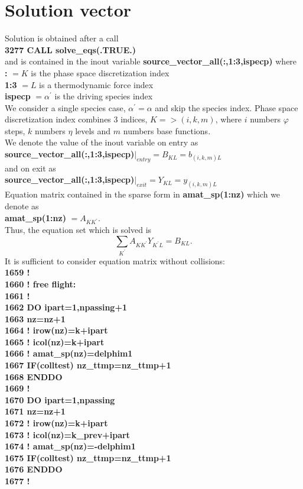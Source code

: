 \documentclass[preprint,prb,aps]{revtex4-1}
\newcommand{\be}[1]{\begin{equation} \label{#1}}
\newcommand{\ee}{\end{equation}}
\begin{document}
\section{Solution vector}
Solution is obtained after a call
\\
{\bf
3277     CALL solve\_eqs(.TRUE.)
}
\\
and is contained in the inout variable
{\bf
source\_vector\_all(:,1:3,ispecp)
}
where
\\
{\bf :} $= K$ is the phase space discretization index
\\
{\bf 1:3} $= L$ is a thermodynamic force index
\\
{\bf ispecp} $= \alpha^\prime$ is the driving species index
\\
We consider a single species case, $\alpha^\prime=\alpha$ and skip the species index.
Phase space discretization index combines 3 indices, $K => (i,k,m)$, where
$i$ numbers $\varphi$ steps, $k$ numbers $\eta$ levels and $m$ numbers base functions.
\\
We denote the value of the inout variable on entry as
\\
{\bf source\_vector\_all(:,1:3,ispecp)}$|_{entry}= B_{KL}=b_{(i,k,m)L}$
\\
and on exit as
\\
{\bf source\_vector\_all(:,1:3,ispecp)}$|_{exit}= Y_{KL}=y_{(i,k,m)L}$
\\
Equation matrix contained in the sparse form in {\bf amat\_sp(1:nz)} which we denote as
\\
{\bf amat\_sp(1:nz)} $= A_{KK^\prime}$.
\\
Thus, the equation set which is solved is
\be{eqset}
\sum_{K^\prime} A_{KK^\prime} Y_{K^\prime L} = B_{KL}.
\ee
It is sufficient to consider equation matrix without collisions:
\\
{\bf
1659 !\\
1660 ! free flight: \\
1661 ! \\
1662       DO ipart=1,npassing+1 \\
1663         nz=nz+1 \\
1664 !        irow(nz)=k+ipart \\
1665 !        icol(nz)=k+ipart \\
1666 !        amat\_sp(nz)=delphim1 \\
1667         IF(colltest) nz\_ttmp=nz\_ttmp+1 \\
1668       ENDDO \\
1669 !\\
1670       DO ipart=1,npassing \\
1671         nz=nz+1 \\
1672 !        irow(nz)=k+ipart \\
1673 !        icol(nz)=k\_prev+ipart \\
1674 !        amat\_sp(nz)=-delphim1 \\
1675         IF(colltest) nz\_ttmp=nz\_ttmp+1 \\
1676       ENDDO \\
1677 !
}
\end{document}
